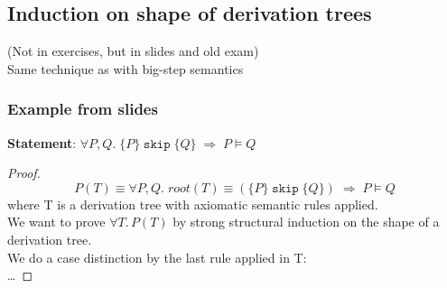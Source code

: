 \documentclass{article}
\def\skipt{\texttt{skip}}
\begin{document}
\subsection{Induction on shape of derivation trees}
(Not in exercises, but in slides and old exam) \\
Same technique as with big-step semantics
\subsubsection{Example from slides}
\textbf{Statement}: $\forall P, Q. \; \{P\} \; \skipt \; \{Q\} \; \Rightarrow \; P \vDash Q$
\begin{proof}
    $$P(T)\equiv \forall P, Q. \; root(T)\equiv(\{P\} \; \skipt \; \{Q\}) \; \Rightarrow \; P \vDash Q$$
    where T is a derivation tree with axiomatic semantic rules applied. \\
    We want to prove $\forall T. \, P(T)$ by strong structural induction on the shape of a derivation tree. \\
    We do a case distinction by the last rule applied in T: \\
    \dots 
\end{proof}
\end{document}
